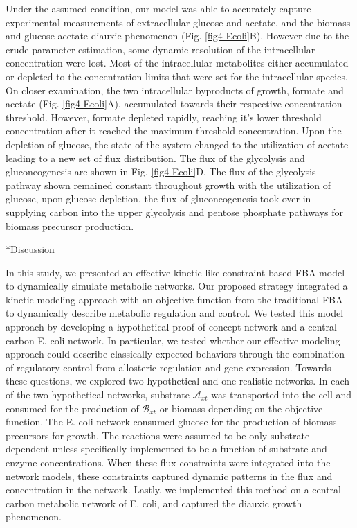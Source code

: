 \documentclass[12pt]{article}
\makeatletter
\renewcommand\section{\@startsection
	{subsection}{2}{0mm}
	{-0.2in}
	{0.05\baselineskip}
	{\normalfont\large\bfseries}}
\makeatother
\begin{document}
Under the assumed condition, our model was able to accurately capture experimental measurements of extracellular glucose and acetate, and the biomass and glucose-acetate diauxie phenomenon (Fig. \ref{fig4-Ecoli}B). However due to the crude parameter estimation, some dynamic resolution of the intracellular concentration were lost. Most of the intracellular metabolites either accumulated or depleted to the concentration limits that were set for the intracellular species. On closer examination, the two intracellular byproducts of growth, formate and acetate (Fig. \ref{fig4-Ecoli}A), accumulated towards their respective concentration threshold. However, formate depleted rapidly, reaching it’s lower threshold concentration after it reached the maximum threshold concentration. Upon the depletion of glucose, the state of the system changed to the utilization of acetate leading to a new set of flux distribution. The flux of the glycolysis and gluconeogenesis are shown in Fig. \ref{fig4-Ecoli}D. The flux of the glycolysis pathway shown remained constant throughout growth with the utilization of glucose, upon glucose depletion, the flux of gluconeogenesis took over in supplying carbon into the upper glycolysis and pentose phosphate pathways for biomass precursor production. 






\clearpage

%

\section*{Discussion}

In this study, we presented an effective kinetic-like constraint-based FBA model to dynamically simulate metabolic networks. Our proposed strategy integrated a kinetic modeling approach with an objective function from the traditional FBA to dynamically describe metabolic regulation and control. We tested this model approach by developing a hypothetical proof-of-concept network and a central carbon E. coli network. In particular, we tested whether our effective modeling approach could describe classically expected behaviors through the combination of regulatory control from allosteric regulation and gene expression. Towards these questions, we explored two hypothetical and one realistic networks. In each of the two hypothetical networks, substrate $\mathcal{A}_{xt}$ was transported into the cell and consumed for the production of $\mathcal{B}_{xt}$ or biomass depending on the objective function. The E. coli network consumed glucose for the production of biomass precursors for growth. The reactions were assumed to be only substrate-dependent unless specifically implemented to be a function of substrate and enzyme concentrations. When these flux constraints were integrated into the network models, these constraints captured dynamic patterns in the flux and concentration in the network. Lastly, we implemented this method on a central carbon metabolic network of E. coli, and captured the diauxic growth phenomenon. 
\end{document}
